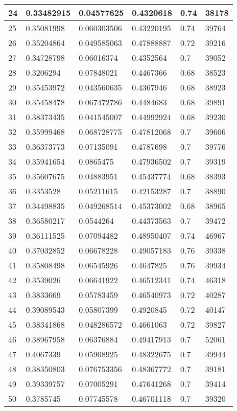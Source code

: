 \begin{longtable}{|l|l|l|l|l|l|}
24 & 0.33482915 & 0.04577625 & 0.4320618 & 0.74 & 38178 \\ \hline 
25 & 0.35081998 & 0.060303506 & 0.43220195 & 0.74 & 39764 \\ \hline 
26 & 0.35204864 & 0.049585063 & 0.47888887 & 0.72 & 39216 \\ \hline 
27 & 0.34728798 & 0.06016374 & 0.4352564 & 0.7 & 39052 \\ \hline 
28 & 0.3206294 & 0.07848021 & 0.4467366 & 0.68 & 38523 \\ \hline 
29 & 0.35453972 & 0.043560635 & 0.4367946 & 0.68 & 38923 \\ \hline 
30 & 0.35458478 & 0.067472786 & 0.4484683 & 0.68 & 39891 \\ \hline 
31 & 0.38373435 & 0.041545007 & 0.44992924 & 0.68 & 39230 \\ \hline 
32 & 0.35999468 & 0.068728775 & 0.47812068 & 0.7 & 39606 \\ \hline 
33 & 0.36373773 & 0.07135091 & 0.4787698 & 0.7 & 39776 \\ \hline 
34 & 0.35941654 & 0.0865475 & 0.47936502 & 0.7 & 39319 \\ \hline 
35 & 0.35607675 & 0.04883951 & 0.45437774 & 0.68 & 38393 \\ \hline 
36 & 0.3353528 & 0.05211615 & 0.42153287 & 0.7 & 38890 \\ \hline 
37 & 0.34498835 & 0.049268514 & 0.45373002 & 0.68 & 38965 \\ \hline 
38 & 0.36580217 & 0.0544264 & 0.44373563 & 0.7 & 39472 \\ \hline 
39 & 0.36111525 & 0.07094482 & 0.48950407 & 0.74 & 46967 \\ \hline 
40 & 0.37032852 & 0.06678228 & 0.49057183 & 0.76 & 39338 \\ \hline 
41 & 0.35808498 & 0.06545926 & 0.4647825 & 0.76 & 39934 \\ \hline 
42 & 0.3539026 & 0.06641922 & 0.46512341 & 0.74 & 46318 \\ \hline 
43 & 0.3833669 & 0.05783459 & 0.46540973 & 0.72 & 40287 \\ \hline 
44 & 0.39089543 & 0.05807399 & 0.4920845 & 0.72 & 40147 \\ \hline 
45 & 0.38341868 & 0.048286572 & 0.4661063 & 0.72 & 39827 \\ \hline 
46 & 0.38967958 & 0.06376884 & 0.49417913 & 0.7 & 52061 \\ \hline 
47 & 0.4067339 & 0.05908925 & 0.48322675 & 0.7 & 39944 \\ \hline 
48 & 0.38350803 & 0.076753356 & 0.48367772 & 0.7 & 39181 \\ \hline 
49 & 0.39339757 & 0.07005291 & 0.47641268 & 0.7 & 39414 \\ \hline 
50 & 0.3785745 & 0.07745578 & 0.46701118 & 0.7 & 39320 \\ \hline 
\end{longtable}